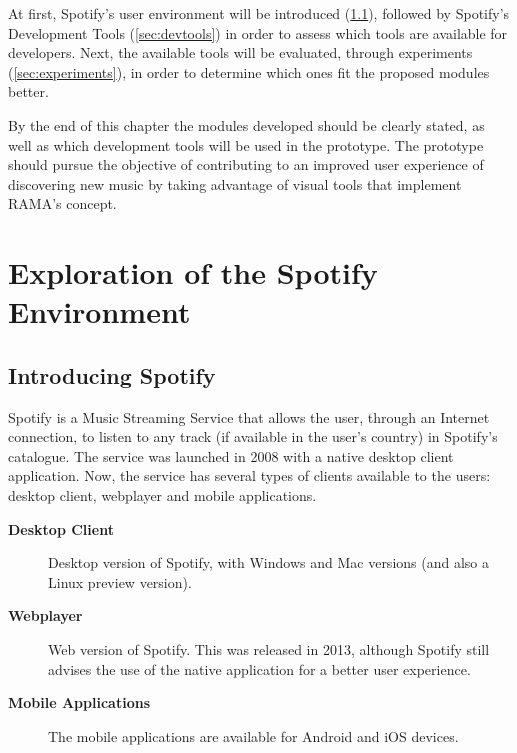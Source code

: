 At first, Spotify's user environment will be introduced (\ref{sec:spotify}), followed by Spotify's Development Tools (\ref{sec:devtools}) in order to assess which tools are available for developers.
Next, the available tools will be evaluated, through experiments (\ref{sec:experiments}), in order to determine which ones fit the proposed modules better.

By the end of this chapter the modules developed should be clearly stated, as well as which development tools will be used in the prototype.
The prototype should pursue the objective of contributing to an improved user experience of discovering new music by taking advantage of visual tools that implement RAMA's concept.

\section{Exploration of the Spotify Environment} %
\label{sec:exploration_of_the_spotify_environment}

  \subsection{Introducing Spotify} %
  \label{sec:spotify}

    Spotify is a Music Streaming Service that allows the user, through an Internet connection, to listen to any track (if available in the user's country) in Spotify's catalogue.
    The service was launched in 2008 with a native desktop client application.
    Now, the service has several types of clients available to the users: desktop client, webplayer and mobile applications.

    \begin{description}
      \item[\textbf{Desktop Client}] Desktop version of Spotify, with Windows and Mac versions (and also a Linux preview version).
      \item[\textbf{Webplayer}] Web version of Spotify. This was released in 2013, although Spotify still advises the use of the native application for a better user experience.
      \item[\textbf{Mobile Applications}] The mobile applications are available for Android and iOS devices.
    \end{description}

    
